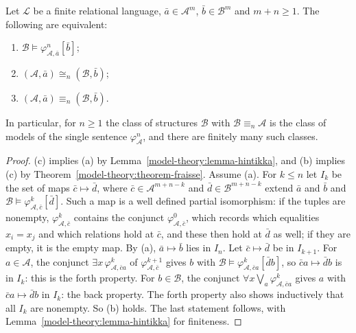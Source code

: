 \begin{theorem}\label{model-theory:theorem-ehrenfeucht-fraisse}
Let $\mathcal{L}$ be a finite relational language, $\bar{a} \in \mathcal{A}^m$, $\bar{b} \in \mathcal{B}^m$ and $m + n \geq 1$. The following are equivalent:
\begin{enumerate}
\item[(a)] $\mathcal{B} \models \varphi^n_{\mathcal{A}, \bar{a}}[\bar{b}]$;
\item[(b)] $(\mathcal{A}, \bar{a}) \cong_n (\mathcal{B}, \bar{b})$;
\item[(c)] $(\mathcal{A}, \bar{a}) \equiv_n (\mathcal{B}, \bar{b})$.
\end{enumerate}
In particular, for $n \geq 1$ the class of structures $\mathcal{B}$ with $\mathcal{B} \equiv_n \mathcal{A}$ is the class of models of the single sentence
$\varphi^n_{\mathcal{A}}$, and there are finitely many such classes.
\end{theorem}

\begin{proof}
(c) implies (a) by Lemma~\ref{model-theory:lemma-hintikka}, and (b) implies (c) by Theorem~\ref{model-theory:theorem-fraisse}. Assume (a). For $k \leq n$ let
$I_k$ be the set of maps $\bar{c} \mapsto \bar{d}$, where $\bar{c} \in \mathcal{A}^{m+n-k}$ and $\bar{d} \in \mathcal{B}^{m+n-k}$ extend $\bar{a}$ and $\bar{b}$ and
$\mathcal{B} \models \varphi^k_{\mathcal{A}, \bar{c}}[\bar{d}]$. Such a map is a well defined partial isomorphism: if the tuples are nonempty,
$\varphi^k_{\mathcal{A}, \bar{c}}$ contains the conjunct $\varphi^0_{\mathcal{A}, \bar{c}}$, which records which equalities $x_i = x_j$ and which relations hold at
$\bar{c}$, and these then hold at $\bar{d}$ as well; if they are empty, it is the empty map. By (a), $\bar{a} \mapsto \bar{b}$ lies in $I_n$. Let
$\bar{c} \mapsto \bar{d}$ be in $I_{k+1}$. For $a \in \mathcal{A}$, the conjunct $\exists x\,\varphi^k_{\mathcal{A}, \bar{c}a}$ of
$\varphi^{k+1}_{\mathcal{A}, \bar{c}}$ gives $b$ with $\mathcal{B} \models \varphi^k_{\mathcal{A}, \bar{c}a}[\bar{d}b]$, so $\bar{c}a \mapsto \bar{d}b$ is in $I_k$:
this is the forth property. For $b \in \mathcal{B}$, the conjunct $\forall x\bigvee_a\varphi^k_{\mathcal{A}, \bar{c}a}$ gives $a$ with $\bar{c}a \mapsto \bar{d}b$ in
$I_k$: the back property. The forth property also shows inductively that all $I_k$ are nonempty. So (b) holds. The last statement follows, with
Lemma~\ref{model-theory:lemma-hintikka} for finiteness.
\end{proof}

